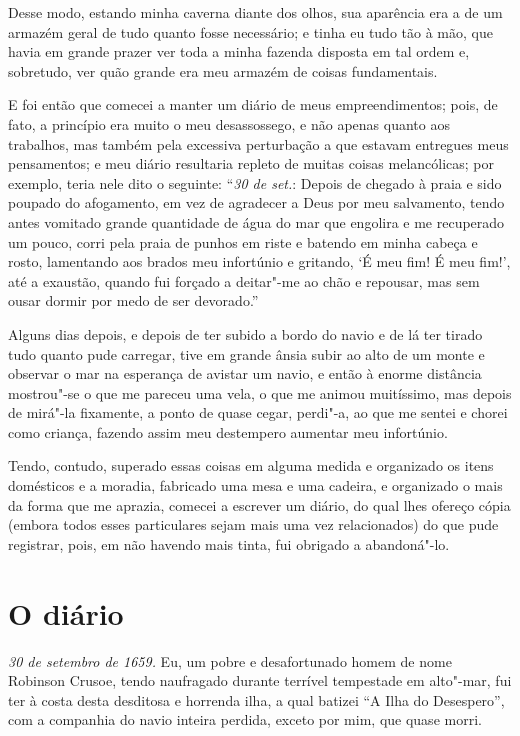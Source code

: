 Desse modo, estando minha caverna diante dos olhos, sua aparência era a
de um armazém geral de tudo quanto fosse necessário; e tinha eu tudo tão
à mão, que havia em grande prazer ver toda a minha fazenda disposta em
tal ordem e, sobretudo, ver quão grande era meu armazém de coisas
fundamentais.

E foi então que comecei a manter um diário de meus empreendimentos;
pois, de fato, a princípio era muito o meu desassossego, e não apenas
quanto aos trabalhos, mas também pela excessiva perturbação a que
estavam entregues meus pensamentos; e meu diário resultaria repleto de
muitas coisas melancólicas; por exemplo, teria nele dito o seguinte:
``\emph{30 de set.}: Depois de chegado à praia e sido poupado do
afogamento, em vez de agradecer a Deus por meu salvamento, tendo antes
vomitado grande quantidade de água do mar que engolira e me recuperado
um pouco, corri pela praia de punhos em riste e batendo em minha cabeça
e rosto, lamentando aos brados meu infortúnio e gritando, `É meu fim! É
meu fim!', até a exaustão, quando fui forçado a deitar"-me ao chão e
repousar, mas sem ousar dormir por medo de ser devorado.''

Alguns dias depois, e depois de ter subido a bordo do navio e de lá ter
tirado tudo quanto pude carregar, tive em grande ânsia subir ao alto de
um monte e observar o mar na esperança de avistar um navio, e então à
enorme distância mostrou"-se o que me pareceu uma vela, o que me animou
muitíssimo, mas depois de mirá"-la fixamente, a ponto de quase cegar,
perdi"-a, ao que me sentei e chorei como criança, fazendo assim meu
destempero aumentar meu infortúnio.

Tendo, contudo, superado essas coisas em alguma medida e organizado os
itens domésticos e a moradia, fabricado uma mesa e uma cadeira, e
organizado o mais da forma que me aprazia, comecei a escrever um diário,
do qual lhes ofereço cópia (embora todos esses particulares sejam mais
uma vez relacionados) do que pude registrar, pois, em não havendo mais
tinta, fui obrigado a abandoná"-lo.

\chapter{O diário}

\emph{30 de setembro de 1659.} Eu, um pobre e desafortunado homem de
nome Robinson Crusoe, tendo naufragado durante terrível tempestade em
alto"-mar, fui ter à costa desta desditosa e horrenda ilha, a qual
batizei ``A Ilha do Desespero'', com a companhia do navio inteira
perdida, exceto por mim, que quase morri.

